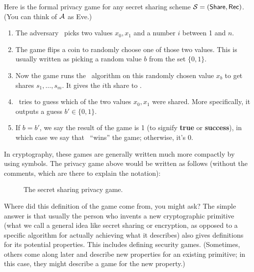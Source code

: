 Here is the formal privacy game for any secret sharing scheme $\mathcal{S} =
(\mathsf{Share},\allowbreak \mathsf{Rec})$. (You can think of $\mathcal{A}$ as Eve.)
\begin{enumerate}
    \item The adversary \A~picks two values $x_0, x_1$ and a number $i$ 
    between 1 and $n$.
    \item The game flips a coin to randomly choose one of those two values.
    This is usually written as picking a random value $b$ from the set 
    $\{0, 1\}$.
    \item Now the game runs the \share~algorithm on this randomly chosen 
    value $x_b$ to get shares $s_1, \ldots, s_m$. It gives the $i$th share
    to \A.
    \item \A~tries to guess which of the two values $x_0, x_1$ were shared.
    More specifically, it outputs a guess $b' \in \{0, 1\}$. 
    \item If $b=b'$, we say the result of the game is 1 (to signify 
    \textbf{true} or \textbf{success}), in which case we say that \A~``wins''
    the game; otherwise, it's 0.
\end{enumerate}

In cryptography, these games are generally written much more compactly by 
using symbols. The privacy game above would be written as follows (without 
the comments, which are there to explain the notation):

\begin{figure}[h!]
\begin{center}\end{center}
\caption{The secret sharing privacy game.}
\label{fig:ss-priv}
\end{figure}

Where did this definition of the game come from, you might ask? The simple 
answer is that usually the person who invents a new cryptographic 
primitive (what we call a general idea like secret sharing or 
encryption, as opposed to a specific algorithm for actually achieving 
what it describes) also gives definitions for its potential properties. 
This includes defining security games. (Sometimes, others come along 
later and describe new properties for an existing primitive; in this 
case, they might describe a game for the new property.) 

